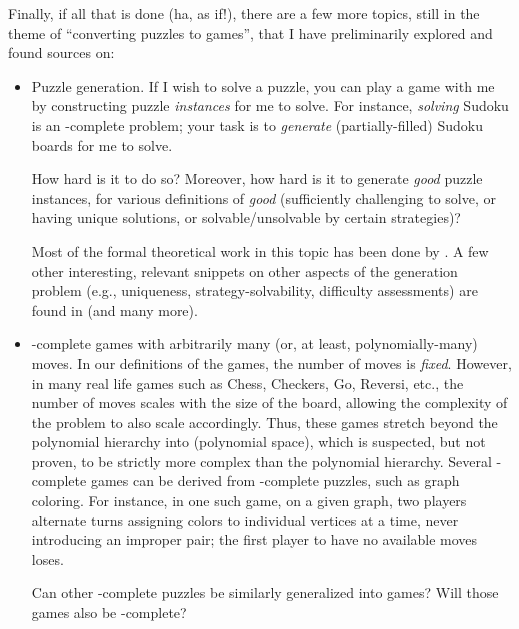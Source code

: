 Finally, if all that is done (ha, as if!), there are a few more topics, still
in the theme of ``converting puzzles to games'', that I have preliminarily
explored and found sources on:
\begin{itemize}

  \item \label{itm:intro.q.generation} Puzzle generation.  If I wish to solve a
    puzzle, you can play a game with me by constructing puzzle \emph{instances}
    for me to solve.  For instance, \emph{solving} Sudoku is an \NP-complete
    problem; your task is to \emph{generate} (partially-filled) Sudoku boards
    for me to solve.

    How hard is it to do so?  Moreover, how hard is it to generate \emph{good}
    puzzle instances, for various definitions of \emph{good} (sufficiently
    challenging to solve, or having unique solutions, or solvable/unsolvable by
    certain strategies)?

    Most of the formal theoretical work in this topic has been done by
    \textcite{language-instances,test-gen-complexity,hard-diverse-graph-tests,maximum-clique-generators}.
    A few other interesting, relevant snippets on other aspects of the
    generation problem (e.g., uniqueness, strategy-solvability, difficulty
    assessments) are found in \textcite{strategy-solvable-sudoku,sudoku-education,unique-sudoku-poly,difficulty-driven-sudoku,sudoku-difficulty-oracle} (and many more).

  \item \label{itm:intro.q.pspace} \PSPACE-complete games with arbitrarily many
    (or, at least, polynomially-many) moves.  In our definitions of the \CSAT{}
    games, the number of moves is \emph{fixed}.  However, in many real life
    games such as Chess, Checkers, Go, Reversi, etc., the number of moves
    scales with the size of the board, allowing the complexity of the problem
    to also scale accordingly.  Thus, these games stretch beyond the polynomial
    hierarchy into \PSPACE{} (polynomial space), which is suspected, but not
    proven, to be strictly more complex than the polynomial hierarchy.  Several
    \PSPACE-complete games can be derived from \NP-complete puzzles, such as
    graph coloring.  For instance, in one such game, on a given graph, two
    players alternate turns assigning colors to individual vertices at a time,
    never introducing an improper pair; the first player to have no available
    moves loses.

    Can other \NP-complete puzzles be similarly generalized into games?  Will
    those games also be \PSPACE-complete?


\end{itemize}
